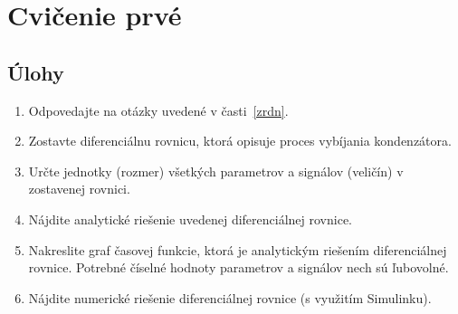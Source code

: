 \documentclass[a4paper, 10pt, ]{article}
\begin{document}

% 


% 















\section{Cvičenie prvé}


\subsection{Úlohy}

\begin{enumerate}[leftmargin=0pt, labelsep=4mm, itemsep=0pt]


    \item Odpovedajte na otázky uvedené v časti~\ref{zrdn}.

	\item Zostavte diferenciálnu rovnicu, ktorá opisuje proces vybíjania kondenzátora.

    \item Určte jednotky (rozmer) všetkých parametrov a signálov (veličín) v zostavenej rovnici.

    \item Nájdite analytické riešenie uvedenej diferenciálnej rovnice.

    \item Nakreslite graf časovej funkcie, ktorá je analytickým riešením diferenciálnej rovnice. Potrebné číselné hodnoty parametrov a signálov nech sú ľubovolné.

    \item Nájdite numerické riešenie diferenciálnej rovnice (s využitím Simulinku).

\end{enumerate}
\end{document}
